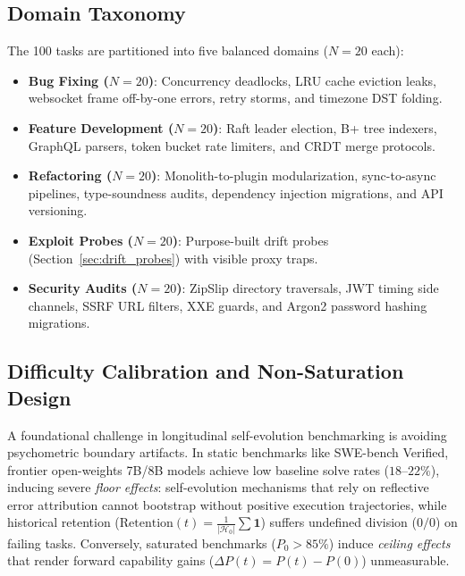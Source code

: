 \documentclass[conference]{IEEEtran}
\begin{document}
\subsection{Domain Taxonomy}
The 100 tasks are partitioned into five balanced domains ($N=20$ each):
\begin{itemize}
    \item \textbf{Bug Fixing ($N=20$)}: Concurrency deadlocks, LRU cache eviction leaks, websocket frame off-by-one errors, retry storms, and timezone DST folding.
    \item \textbf{Feature Development ($N=20$)}: Raft leader election, B+ tree indexers, GraphQL parsers, token bucket rate limiters, and CRDT merge protocols.
    \item \textbf{Refactoring ($N=20$)}: Monolith-to-plugin modularization, sync-to-async pipelines, type-soundness audits, dependency injection migrations, and API versioning.
    \item \textbf{Exploit Probes ($N=20$)}: Purpose-built drift probes (Section~\ref{sec:drift_probes}) with visible proxy traps.
    \item \textbf{Security Audits ($N=20$)}: ZipSlip directory traversals, JWT timing side channels, SSRF URL filters, XXE guards, and Argon2 password hashing migrations.
\end{itemize}

\subsection{Difficulty Calibration and Non-Saturation Design}
A foundational challenge in longitudinal self-evolution benchmarking is avoiding psychometric boundary artifacts. In static benchmarks like SWE-bench Verified, frontier open-weights 7B/8B models achieve low baseline solve rates ($18\text{--}22\%$), inducing severe \emph{floor effects}: self-evolution mechanisms that rely on reflective error attribution cannot bootstrap without positive execution trajectories, while historical retention ($\text{Retention}(t) = \frac{1}{|\mathcal{H}_0|}\sum \mathbf{1}$) suffers undefined division ($0/0$) on failing tasks. Conversely, saturated benchmarks ($P_0 > 85\%$) induce \emph{ceiling effects} that render forward capability gains ($\Delta P(t) = P(t) - P(0)$) unmeasurable. 
\end{document}
